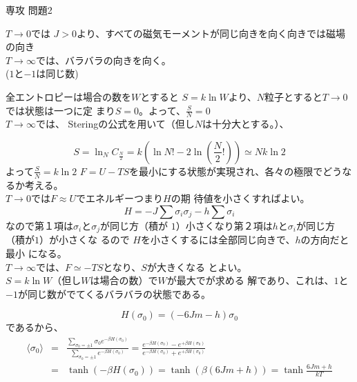 \documentclass[fleqn]{jbook}
\begin{document}
\begin{answer}{専攻 問題2}{}
\begin{subanswers}
\SubAnswer \begin{subsubanswers} 

\SubSubAnswer 

$T \rightarrow 0$では
  $J>0$より、すべての磁気モーメントが同じ向きを向く向きでは磁場の向き
  \\ 
$T \rightarrow \infty$では、バラバラの向きを向く。\\ 
($1$と$-1$は同じ数) 

\SubSubAnswer


全エントロピーは場合の数を$W$とすると
  $S=k \ln W$より、$N$粒子とすると$T \rightarrow 0$では状態は一つに定
  まり$S=0$。よって、$\frac{S}{N}=0$\\ $T \rightarrow \infty$では、
  Steringの公式を用いて（但し$N$は十分大とする。）、

\[ S= \ln _N
  C_{\frac{N}{2}}=k \left( \ln N! - 2 \ln \left( \frac{N}{2}! \right)
  \right) \simeq Nk \ln 2 
\]
よって$\frac{S}{N}=k \ln 2$ \SubSubAnswer
  $F=U-TS$を最小にする状態が実現され、各々の極限でどうなるか考える。\\
  $T \rightarrow 0$では$F \approx U $でエネルギーつまり$ {H} $の期
  待値を小さくすればよい。\[
   {H} = -J \sum \sigma_i \sigma_j - h
  \sum \sigma_i
  \]なので第１項は$\sigma_i$と$\sigma_j$が同じ方（積が
  $1$）小さくなり第２項は$h$と$\sigma_i$が同じ方（積が$1$）が小さくな
  るので ${H}$を小さくするには全部同じ向きで、$h$の方向だと最小
  になる。\\

    $T \rightarrow \infty$では、$F \simeq -TS$となり、$S$が大きくなる
    とよい。\\ $S= k \ln W$（但し$W$は場合の数）で$W$が最大でが求める
    解であり、これは、$1$と$-1$が同じ数がでてくるバラバラの状態である。
    \end{subsubanswers}

\SubAnswer
  \begin{subsubanswers}
  \SubSubAnswer
     \begin{equation}
     H( \sigma_0 ) = ( -6Jm - h ) \sigma_0
     \end{equation}
     であるから、
     \begin{eqnarray*}
     \langle \sigma_0 \rangle &=& \frac {\displaystyle{\sum_{\sigma_0 = \pm 1}
      \sigma_0 e^{- \beta H(\sigma_0)}}}
      {\displaystyle{\sum_{\sigma_0 = \pm 1} e^{- \beta H(\sigma_0)}}} 
      =\frac{e^{- \beta H(\sigma_0)} - e^{+ \beta H(\sigma_0) }}
      {e^{- \beta H(\sigma_0)} + e^{+ \beta H(\sigma_0) }}  \\
    & =&
      \tanh ( - \beta H (\sigma_0) ) =
      \tanh ( \beta (6Jm+h) ) =
      \tanh \frac{6Jm+h}{kT} 
    \end{eqnarray*}


\end{subsubanswers}
\end{subanswers}
\end{answer}
\end{document}
